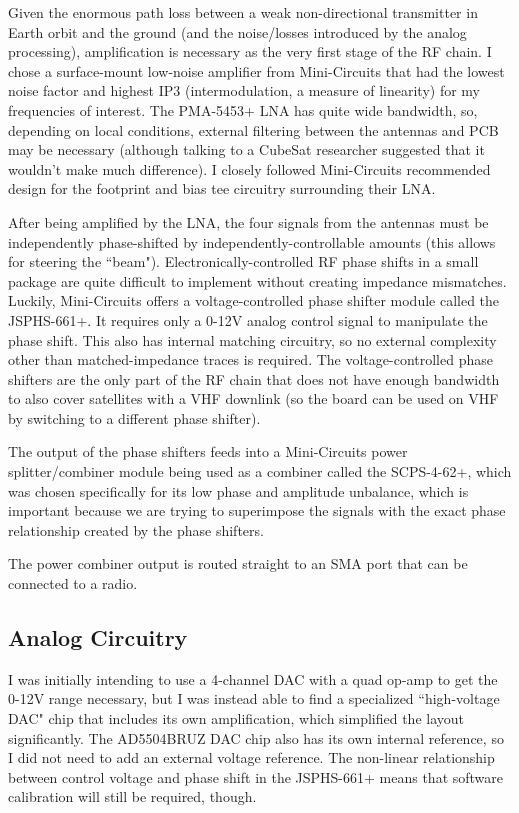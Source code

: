 \documentclass[fleqn]{article}
\begin{document}
Given the enormous path loss between a weak non-directional transmitter in Earth orbit and the ground (and the noise/losses introduced by the analog processing), amplification is necessary as the very first stage of the RF chain. I chose a surface-mount low-noise amplifier from Mini-Circuits that had the lowest noise factor and highest IP3 (intermodulation, a measure of linearity) for my frequencies of interest. The PMA-5453+ LNA has quite wide bandwidth, so, depending on local conditions, external filtering between the antennas and PCB may be necessary (although talking to a CubeSat researcher suggested that it wouldn't make much difference). I closely followed Mini-Circuits recommended design for the footprint and bias tee circuitry surrounding their LNA.

After being amplified by the LNA, the four signals from the antennas must be independently phase-shifted by independently-controllable amounts (this allows for steering the ``beam"). Electronically-controlled RF phase shifts in a small package are quite difficult to implement without creating impedance mismatches. Luckily, Mini-Circuits offers a voltage-controlled phase shifter module called the JSPHS-661+. It requires only a 0-12V analog control signal to manipulate the phase shift. This also has internal matching circuitry, so no external complexity other than matched-impedance traces is required. The voltage-controlled phase shifters are the only part of the RF chain that does not have enough bandwidth to also cover satellites with a VHF downlink (so the board can be used on VHF by switching to a different phase shifter).

The output of the phase shifters feeds into a Mini-Circuits power splitter/combiner module being used as a combiner called the SCPS-4-62+, which was chosen specifically for its low phase and amplitude unbalance, which is important because we are trying to superimpose the signals with the exact phase relationship created by the phase shifters.

The power combiner output is routed straight to an SMA port that can be connected to a radio.

\subsection{Analog Circuitry}

I was initially intending to use a 4-channel DAC with a quad op-amp to get the 0-12V range necessary, but I was instead able to find a specialized ``high-voltage DAC" chip that includes its own amplification, which simplified the layout significantly. The AD5504BRUZ DAC chip also has its own internal reference, so I did not need to add an external voltage reference. The non-linear relationship between control voltage and phase shift in the JSPHS-661+ means that software calibration will still be required, though.
\end{document}
